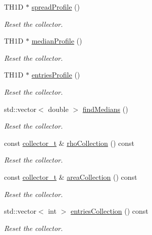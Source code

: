 \begin{DoxyCompactItemize}
T\+H1D $\ast$ \hyperlink{classSlidingWindow_1_1Window_a2f635b99980da8f83ad16c865b1d9378}{spread\+Profile} ()
\begin{DoxyCompactList}\small\item\em Reset the collector. \end{DoxyCompactList}\item 
T\+H1D $\ast$ \hyperlink{classSlidingWindow_1_1Window_ace2ce2aa3b66eea31ef1f03acff976b2}{median\+Profile} ()
\begin{DoxyCompactList}\small\item\em Reset the collector. \end{DoxyCompactList}\item 
T\+H1D $\ast$ \hyperlink{classSlidingWindow_1_1Window_a8981fc06aac580eeaf0a47f075f5d7e0}{entries\+Profile} ()
\begin{DoxyCompactList}\small\item\em Reset the collector. \end{DoxyCompactList}\item 
std\+::vector$<$ double $>$ \hyperlink{classSlidingWindow_1_1Window_a77d21efe15501ae7d293f1107ee1f884}{find\+Medians} ()
\begin{DoxyCompactList}\small\item\em Reset the collector. \end{DoxyCompactList}\item 
const \hyperlink{classSlidingWindow_1_1Window_a86da88957da29f042341ff4b0413316e}{collector\+\_\+t} \& \hyperlink{classSlidingWindow_1_1Window_acd125998cc557744021e2177572dcb26}{rho\+Collection} () const 
\begin{DoxyCompactList}\small\item\em Reset the collector. \end{DoxyCompactList}\item 
const \hyperlink{classSlidingWindow_1_1Window_a86da88957da29f042341ff4b0413316e}{collector\+\_\+t} \& \hyperlink{classSlidingWindow_1_1Window_a8724fe27d8ce5285ac18687337e8d051}{area\+Collection} () const 
\begin{DoxyCompactList}\small\item\em Reset the collector. \end{DoxyCompactList}\item 
std\+::vector$<$ int $>$ \hyperlink{classSlidingWindow_1_1Window_a54fbc911abec5ef96753330dd9f7dff1}{entries\+Collection} () const 
\begin{DoxyCompactList}\small\item\em Reset the collector. \end{DoxyCompactList}\item 

\end{DoxyCompactItemize}
